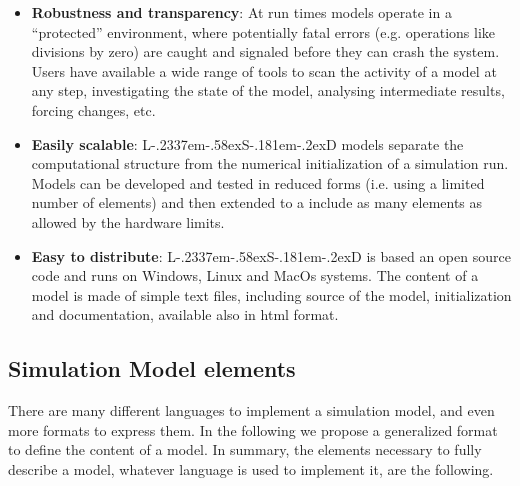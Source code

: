 \documentclass [11pt,a4paper] {book}
\def\LsD{{L\kern-.2337em\lower-.58ex\hbox{S}\kern-.181em\lower-.2ex\hbox{D}}\xspace}
\begin{document}
\begin{itemize}
 \item \textbf{Robustness and transparency}: At run times models operate in a ``protected'' environment, where potentially fatal errors (e.g. operations like divisions by zero) are caught and signaled before they can crash the system. Users have available a wide range of tools to scan the activity of a model at any step, investigating the state of the model, analysing intermediate results, forcing changes, etc.
 
 \item \textbf{Easily scalable}: \LsD models separate the computational structure from the numerical initialization of a simulation run. Models can be developed and tested in reduced forms (i.e. using a limited number of elements) and then extended to a include as many elements as allowed by the hardware limits.

 \item \textbf{Easy to distribute}: \LsD is based an open source code and runs on Windows, Linux and MacOs systems. The content of a model is made of simple text files, including source of the model, initialization and documentation, available also in html format.
 
 

\end{itemize}



\subsection{Simulation Model elements}


There are many different languages to implement a simulation model, and even more formats to express them. In the following we propose a generalized format to define the content of a model. In summary, the elements necessary to fully describe a model, whatever language is used to implement it, are the following.
\end{document}
